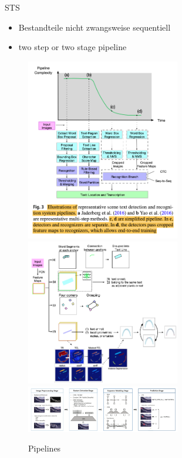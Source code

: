 STS
\begin{itemize}
    \item Bestandteile nicht zwangsweise sequentiell
    \item two step or two stage pipeline
\end{itemize}

\begin{figure}[h]
    \centering
    \includegraphics[width=0.60\textwidth]{img/Long-Scene-2021-Pipeline-Changes.png}
    \includegraphics[width=0.60\textwidth]{img/Long-Scene-2021-STD-Pipelines.png}
    \includegraphics[width=0.60\textwidth]{img/Chen-Text-2021-STR-Pipeline.png}
    \caption{Pipelines~\citep{long_scene_2021,chen_text_2021}\label{fig:piplineChanges}}
\end{figure}

